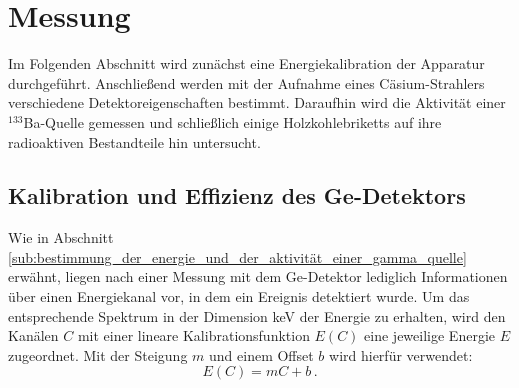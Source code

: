 \section{Messung}
\label{sec:messung}
Im Folgenden Abschnitt wird zunächst eine Energiekalibration der Apparatur
durchgeführt. Anschließend werden mit der Aufnahme eines Cäsium-Strahlers
verschiedene Detektoreigenschaften bestimmt.
Daraufhin wird die Aktivität einer $^{133}$Ba-Quelle gemessen und schließlich einige
Holzkohlebriketts auf ihre radioaktiven Bestandteile hin untersucht.

\subsection{Kalibration und Effizienz des Ge-Detektors}
\label{subse:eichung}
Wie in Abschnitt \ref{sub:bestimmung_der_energie_und_der_aktivität_einer_gamma_quelle}
erwähnt, liegen nach einer Messung mit dem Ge-Detektor lediglich Informationen
über einen Energiekanal vor, in dem ein Ereignis detektiert wurde.
Um das entsprechende Spektrum in der Dimension \si{keV} der Energie zu erhalten,
wird den Kanälen $C$ mit einer lineare Kalibrationsfunktion $E(C)$ eine jeweilige
Energie $E$ zugeordnet.
Mit der Steigung $m$ und einem Offset $b$ wird hierfür verwendet:%
%
\begin{equation}
    \label{eqn:kalibration}
    E(C) = mC + b\,.
\end{equation}

